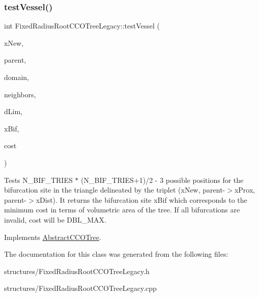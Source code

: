 \subsubsection{\texorpdfstring{test\+Vessel()}{testVessel()}}
{\footnotesize\ttfamily int Fixed\+Radius\+Root\+C\+C\+O\+Tree\+Legacy\+::test\+Vessel (\begin{DoxyParamCaption}\item[{\mbox{\hyperlink{structpoint}{point}}}]{x\+New,  }\item[{\mbox{\hyperlink{structvessel}{vessel}} $\ast$}]{parent,  }\item[{\mbox{\hyperlink{class_abstract_domain}{Abstract\+Domain}} $\ast$}]{domain,  }\item[{vector$<$ \mbox{\hyperlink{structvessel}{vessel}} $\ast$$>$}]{neighbors,  }\item[{double}]{d\+Lim,  }\item[{\mbox{\hyperlink{structpoint}{point}} $\ast$}]{x\+Bif,  }\item[{double $\ast$}]{cost }\end{DoxyParamCaption})\hspace{0.3cm}{\ttfamily [virtual]}}

Tests N\+\_\+\+B\+I\+F\+\_\+\+T\+R\+I\+ES $\ast$ (N\+\_\+\+B\+I\+F\+\_\+\+T\+R\+I\+E\+S+1)/2 -\/ 3 possible positions for the bifurcation site in the triangle delineated by the triplet (x\+New, parent-\/$>$x\+Prox, parent-\/$>$x\+Dist). It returns the bifurcation site x\+Bif which corresponds to the minimum cost in terms of volumetric area of the tree. If all bifurcations are invalid, cost will be D\+B\+L\+\_\+\+M\+AX. 

Implements \mbox{\hyperlink{class_abstract_c_c_o_tree}{Abstract\+C\+C\+O\+Tree}}.



The documentation for this class was generated from the following files\+:\begin{DoxyCompactItemize}
\item 
structures/Fixed\+Radius\+Root\+C\+C\+O\+Tree\+Legacy.\+h\item 
structures/Fixed\+Radius\+Root\+C\+C\+O\+Tree\+Legacy.\+cpp\end{DoxyCompactItemize}
